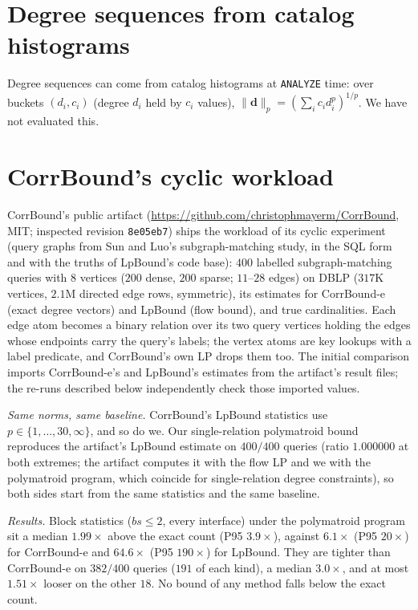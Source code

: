\documentclass[11pt]{article}
\begin{document}
\section{Degree sequences from catalog histograms}
Degree sequences can come from catalog histograms at \texttt{ANALYZE} time: over buckets $(d_i, c_i)$ (degree $d_i$ held by $c_i$ values), $\|\mathbf{d}\|_p = (\sum_i c_i d_i^p)^{1/p}$. We have not evaluated this.

\section{CorrBound's cyclic workload}
CorrBound's public artifact (\url{https://github.com/christophmayerm/CorrBound}, MIT; inspected revision \texttt{8e05eb7}) ships the
workload of its cyclic experiment (query graphs from Sun and Luo's subgraph-matching study, in the SQL form and with the truths of LpBound's code base): $400$ labelled subgraph-matching queries
with $8$ vertices ($200$ dense, $200$ sparse; $11$--$28$ edges) on DBLP
($317$K vertices, $2.1$M directed edge rows, symmetric), its estimates for
CorrBound-e (exact degree vectors) and LpBound (flow bound), and true
cardinalities. Each edge atom becomes a binary relation over its two query
vertices holding the edges whose endpoints carry the query's labels; the
vertex atoms are key lookups with a label predicate, and CorrBound's own LP
drops them too. The initial comparison imports CorrBound-e's and LpBound's estimates from the artifact's result files; the re-runs described below independently check those imported values.

\emph{Same norms, same baseline.} CorrBound's LpBound statistics use
$p\in\{1,\dots,30,\infty\}$, and so do we. Our single-relation polymatroid
bound reproduces the artifact's LpBound estimate on $400/400$ queries
(ratio $1.000000$ at both extremes; the artifact computes it with the
flow LP and we with the polymatroid program, which coincide for
single-relation degree constraints), so both sides start from the same
statistics and the same baseline.

\emph{Results.} Block statistics ($bs{\le}2$, every interface) under the
polymatroid program sit a median $1.99\times$ above the exact count (P95
$3.9\times$), against $6.1\times$ (P95 $20\times$) for CorrBound-e and
$64.6\times$ (P95 $190\times$) for LpBound. They are tighter than CorrBound-e
on $382/400$ queries ($191$ of each kind), a median $3.0\times$, and at most
$1.51\times$ looser on the other $18$. No bound of any method falls below the
exact count.
\end{document}
